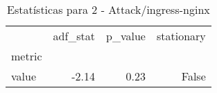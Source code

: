 \begin{table}[htbp]
\caption{Estatísticas para 2 - Attack/ingress-nginx}
\label{tab:2_-_attack_ingress-nginx_adf_test}
\begin{tabular}{lrrr}
\toprule
 & adf_stat & p_value & stationary \\
metric &  &  &  \\
\midrule
value & -2.14 & 0.23 & False \\
\bottomrule
\end{tabular}
\end{table}
